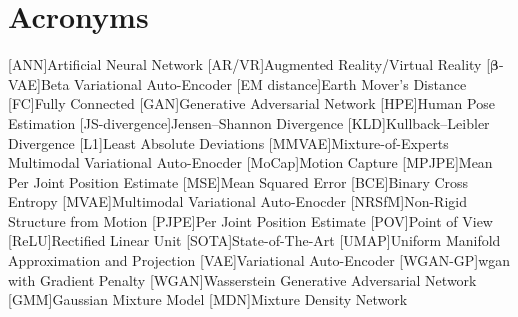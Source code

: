 \chapter*{Acronyms}

\begin{acronym}[TBD]
    [ANN]{Artificial Neural Network}
    [AR/VR]{Augmented Reality/Virtual Reality}
    [$\boldsymbol{\beta}$-VAE]{Beta Variational Auto-Encoder}
    [EM distance]{Earth Mover's Distance}
    [FC]{Fully Connected}
    [GAN]{Generative Adversarial Network}
    [HPE]{Human Pose Estimation}
    [JS-divergence]{Jensen–Shannon Divergence}
    [KLD]{Kullback–Leibler Divergence}
    [L1]{Least Absolute Deviations}
    [MMVAE]{Mixture-of-Experts Multimodal Variational Auto-Enocder}
    [MoCap]{Motion Capture}
    [MPJPE]{Mean Per Joint Position Estimate}
    [MSE]{Mean Squared Error}
    [BCE]{Binary Cross Entropy}
    [MVAE]{Multimodal Variational Auto-Enocder}
    [NRSfM]{Non-Rigid Structure from Motion}
    [PJPE]{Per Joint Position Estimate}
    [POV]{Point of View}
    [ReLU]{Rectified Linear Unit}
    [SOTA]{State-of-The-Art}
    [UMAP]{Uniform Manifold Approximation and Projection}
    [VAE]{Variational Auto-Encoder}
    [WGAN-GP]{\ac{wgan} with Gradient Penalty}
    [WGAN]{Wasserstein Generative Adversarial Network}
    [GMM]{Gaussian Mixture Model}
    [MDN]{Mixture Density Network}
\end{acronym}

